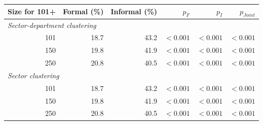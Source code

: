 \begin{tabular}{rrrrrr}
\toprule
    Size for 101+ & Formal (\%) & Informal (\%) & $p_F$ & $p_I$ & $p_{Joint}$ \\[0.25em]
    \midrule
\multicolumn{6}{l}{\textit{Sector-department clustering}} \\
101 & 18.7 & 43.2 & $<0.001$ & $<0.001$ & $<0.001$ \\
150 & 19.8 & 41.9 & $<0.001$ & $<0.001$ & $<0.001$ \\
250 & 20.8 & 40.5 & $<0.001$ & $<0.001$ & $<0.001$ \\
\midrule
    \multicolumn{6}{l}{\textit{Sector clustering}} \\
101 & 18.7 & 43.2 & $<0.001$ & $<0.001$ & $<0.001$ \\
150 & 19.8 & 41.9 & $<0.001$ & $<0.001$ & $<0.001$ \\
250 & 20.8 & 40.5 & $<0.001$ & $<0.001$ & $<0.001$\\
\bottomrule\end{tabular}
